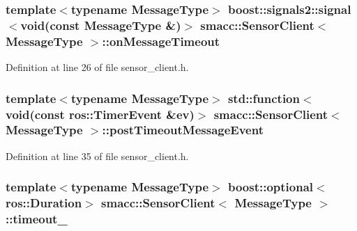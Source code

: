 \subsubsection[{\texorpdfstring{on\+Message\+Timeout}{onMessageTimeout}}]{\setlength{\rightskip}{0pt plus 5cm}template$<$typename Message\+Type$>$ boost\+::signals2\+::signal$<$void(const Message\+Type \&)$>$ {\bf smacc\+::\+Sensor\+Client}$<$ Message\+Type $>$\+::on\+Message\+Timeout}\hypertarget{classsmacc_1_1SensorClient_a3652c00d16a1a82ef6b43466ef360c72}{}\label{classsmacc_1_1SensorClient_a3652c00d16a1a82ef6b43466ef360c72}


Definition at line 26 of file sensor\+\_\+client.\+h.

\subsubsection[{\texorpdfstring{post\+Timeout\+Message\+Event}{postTimeoutMessageEvent}}]{\setlength{\rightskip}{0pt plus 5cm}template$<$typename Message\+Type$>$ std\+::function$<$void(const ros\+::\+Timer\+Event \&ev)$>$ {\bf smacc\+::\+Sensor\+Client}$<$ Message\+Type $>$\+::post\+Timeout\+Message\+Event}\hypertarget{classsmacc_1_1SensorClient_ad2c6d9f2e7ceddac26024cd5901a6739}{}\label{classsmacc_1_1SensorClient_ad2c6d9f2e7ceddac26024cd5901a6739}


Definition at line 35 of file sensor\+\_\+client.\+h.

\subsubsection[{\texorpdfstring{timeout\+\_\+}{timeout_}}]{\setlength{\rightskip}{0pt plus 5cm}template$<$typename Message\+Type$>$ boost\+::optional$<$ros\+::\+Duration$>$ {\bf smacc\+::\+Sensor\+Client}$<$ Message\+Type $>$\+::timeout\+\_\+}\hypertarget{classsmacc_1_1SensorClient_a660452b6940625d3c60581961124ebd8}{}\label{classsmacc_1_1SensorClient_a660452b6940625d3c60581961124ebd8}


